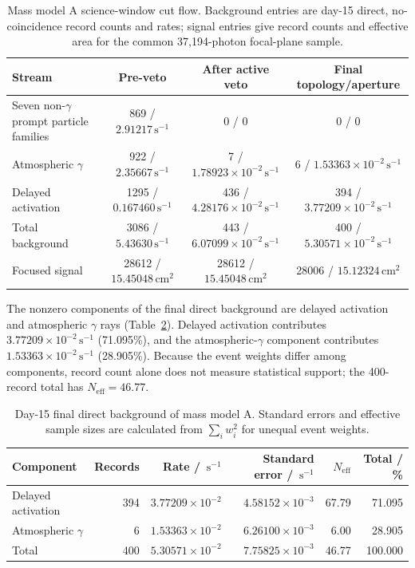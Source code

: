 \documentclass[11pt]{article}
\newcommand{\cps}{\ensuremath{\,\mathrm{s^{-1}}}}
\begin{document}
\begin{table}[H]
\centering
\caption{Mass model A science-window cut flow. Background entries are day-15 direct, no-coincidence record counts and rates; signal entries give record counts and effective area for the common 37,194-photon focal-plane sample.}
\label{tab:phase2_cutflow}
\footnotesize
\begin{tabular}{lccc}
\toprule
Stream & Pre-veto & After active veto & Final topology/aperture \\
\midrule
Seven non-$\gamma$ prompt particle families & 869 / $2.91217\cps$ & 0 / 0 & 0 / 0 \\
Atmospheric $\gamma$ & 922 / $2.35667\cps$ & 7 / $1.78923\times10^{-2}\cps$ & 6 / $1.53363\times10^{-2}\cps$ \\
Delayed activation & 1295 / $0.167460\cps$ & 436 / $4.28176\times10^{-2}\cps$ & 394 / $3.77209\times10^{-2}\cps$ \\
Total background & 3086 / $5.43630\cps$ & 443 / $6.07099\times10^{-2}\cps$ & 400 / $5.30571\times10^{-2}\cps$ \\
Focused signal & 28612 / $15.45048\,\mathrm{cm^2}$ & 28612 / $15.45048\,\mathrm{cm^2}$ & 28006 / $15.12324\,\mathrm{cm^2}$ \\
\bottomrule
\end{tabular}
\end{table}

The nonzero components of the final direct background are delayed activation
and atmospheric $\gamma$ rays
(Table~\ref{tab:reference_background_budget}). Delayed activation contributes
$3.77209\times10^{-2}\cps$ (71.095\%), and the atmospheric-$\gamma$ component contributes
$1.53363\times10^{-2}\cps$ (28.905\%). Because the event weights differ among
components, record count alone does not measure statistical support; the
400-record total has $N_{\mathrm{eff}}=46.77$.

\begin{table}[H]
\centering
\caption{Day-15 final direct background of mass model A. Standard errors and effective sample sizes are calculated from $\sum_i w_i^2$ for unequal event weights.}
\label{tab:reference_background_budget}
\footnotesize
\begin{tabular}{lrrrrr}
\toprule
Component & Records & Rate / $\cps$ & Standard error / $\cps$ & $N_{\mathrm{eff}}$ & Total / \% \\
\midrule
Delayed activation & 394 & $3.77209\times10^{-2}$ & $4.58152\times10^{-3}$ & 67.79 & 71.095 \\
Atmospheric $\gamma$ & 6 & $1.53363\times10^{-2}$ & $6.26100\times10^{-3}$ & 6.00 & 28.905 \\
\midrule
Total & 400 & $5.30571\times10^{-2}$ & $7.75825\times10^{-3}$ & 46.77 & 100.000 \\
\bottomrule
\end{tabular}
\end{table}
\end{document}
